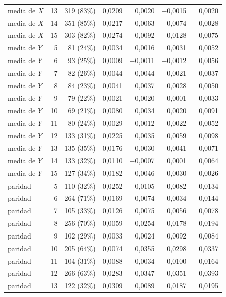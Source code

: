 \begin{table}[htbp]
{\begin{tabular}{@{}lrrrrrr@{}}
        media de $X$ & 13 & 319 (83\%) & 0,0209 & 0,0020 & $-$0,0015 & 0,0020 \\
        media de $X$ & 14 & 351 (85\%) & 0,0217 & $-$0,0063 & $-$0,0074 & $-$0,0028 \\
        media de $X$ & 15 & 303 (82\%) & 0,0274 & $-$0,0092 & $-$0,0128 & $-$0,0075 \\
        media de $Y$ & 5 & 81 (24\%) & 0,0034 & 0,0016 & 0,0031 & 0,0052 \\
        media de $Y$ & 6 & 93 (25\%) & 0,0009 & $-$0,0011 & $-$0,0012 & 0,0056 \\
        media de $Y$ & 7 & 82 (26\%) & 0,0044 & 0,0044 & 0,0021 & 0,0037 \\
        media de $Y$ & 8 & 84 (23\%) & 0,0041 & 0,0037 & 0,0028 & 0,0050 \\
        media de $Y$ & 9 & 79 (22\%) & 0,0021 & 0,0020 & 0,0001 & 0,0033 \\
        media de $Y$ & 10 & 69 (21\%) & 0,0080 & 0,0034 & 0,0020 & 0,0091 \\
        media de $Y$ & 11 & 80 (24\%) & 0,0029 & 0,0012 & $-$0,0022 & 0,0052 \\
        media de $Y$ & 12 & 133 (31\%) & 0,0225 & 0,0035 & 0,0059 & 0,0098 \\
        media de $Y$ & 13 & 135 (35\%) & 0,0176 & 0,0030 & 0,0041 & 0,0071 \\
        media de $Y$ & 14 & 133 (32\%) & 0,0110 & $-$0,0007 & 0,0001 & 0,0064 \\
        media de $Y$ & 15 & 127 (34\%) & 0,0182 & $-$0,0046 & $-$0,0030 & 0,0026 \\
        paridad & 5 & 110 (32\%) & 0,0252 & 0,0105 & 0,0082 & 0,0134 \\
        paridad & 6 & 264 (71\%) & 0,0169 & 0,0074 & 0,0034 & 0,0144 \\
        paridad & 7 & 105 (33\%) & 0,0126 & 0,0075 & 0,0056 & 0,0078 \\
        paridad & 8 & 256 (70\%) & 0,0059 & 0,0254 & 0,0178 & 0,0194 \\
        paridad & 9 & 102 (29\%) & 0,0033 & 0,0024 & 0,0092 & 0,0084 \\
        paridad & 10 & 205 (64\%) & 0,0074 & 0,0355 & 0,0298 & 0,0337 \\
        paridad & 11 & 104 (31\%) & 0,0088 & 0,0034 & 0,0100 & 0,0164 \\
        paridad & 12 & 266 (63\%) & 0,0283 & 0,0347 & 0,0351 & 0,0393 \\
        paridad & 13 & 122 (32\%) & 0,0309 & 0,0089 & 0,0187 & 0,0195 \\

\end{tabular}}
\end{table}
